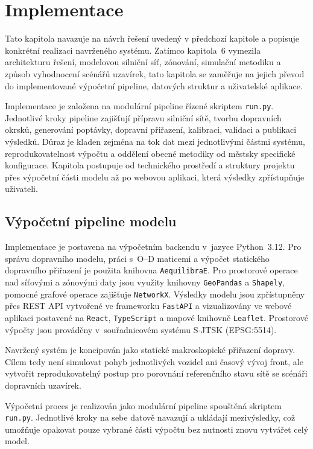 \chapter{Implementace}
Tato kapitola navazuje na návrh řešení uvedený v předchozí kapitole a popisuje konkrétní realizaci navrženého systému. Zatímco kapitola~6 vymezila architekturu řešení, modelovou silniční síť, zónování, simulační metodiku a způsob vyhodnocení scénářů uzavírek, tato kapitola se zaměřuje na jejich převod do implementované výpočetní pipeline, datových struktur a uživatelské aplikace.

Implementace je založena na modulární pipeline řízené skriptem \texttt{run.py}. Jednotlivé kroky pipeline zajišťují přípravu silniční sítě, tvorbu dopravních okrsků, generování poptávky, dopravní přiřazení, kalibraci, validaci a publikaci výsledků. Důraz je kladen zejména na tok dat mezi jednotlivými částmi systému, reprodukovatelnost výpočtu a oddělení obecné metodiky od městsky specifické konfigurace. Kapitola postupuje od technického prostředí a struktury projektu přes výpočetní části modelu až po webovou aplikaci, která výsledky zpřístupňuje uživateli.


\section{Výpočetní pipeline modelu}
\label{sec:impl-pipeline}

Implementace je postavena na výpočetním backendu v~jazyce Python~3.12. Pro správu dopravního modelu, práci s~O--D maticemi a výpočet statického dopravního přiřazení je použita knihovna \texttt{AequilibraE}. Pro prostorové operace nad síťovými a zónovými daty jsou využity knihovny \texttt{GeoPandas} a \texttt{Shapely}, pomocné grafové operace zajišťuje \texttt{NetworkX}. Výsledky modelu jsou zpřístupněny přes REST API vytvořené ve frameworku \texttt{FastAPI} a vizualizovány ve webové aplikaci postavené na \texttt{React}, \texttt{TypeScript} a mapové knihovně \texttt{Leaflet}. Prostorové výpočty jsou prováděny v~souřadnicovém systému S-JTSK (EPSG:5514).

Navržený systém je koncipován jako statické makroskopické přiřazení dopravy. Cílem tedy není simulovat pohyb jednotlivých vozidel ani časový vývoj front, ale vytvořit reprodukovatelný postup pro porovnání referenčního stavu sítě se scénáři dopravních uzavírek.

Výpočetní proces je realizován jako modulární pipeline spouštěná skriptem \texttt{run.py}. Jednotlivé kroky na sebe datově navazují a ukládají mezivýsledky, což umožňuje opakovat pouze vybrané části výpočtu bez nutnosti znovu vytvářet celý model.

